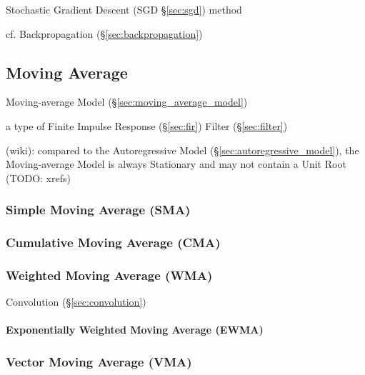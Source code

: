 Stochastic Gradient Descent (SGD \S\ref{sec:sgd}) method

cf. Backpropagation (\S\ref{sec:backpropagation})



\subsection{Moving Average}\label{sec:moving_average}

Moving-average Model (\S\ref{sec:moving_average_model})

a type of Finite Impulse Response (\S\ref{sec:fir}) Filter (\S\ref{sec:filter})

(wiki): compared to the Autoregressive Model (\S\ref{sec:autoregressive_model}),
the Moving-average Model is always Stationary and may not contain a Unit Root
(TODO: xrefs)



\subsubsection{Simple Moving Average (SMA)}\label{sec:sma}

\subsubsection{Cumulative Moving Average (CMA)}\label{sec:cma}

\subsubsection{Weighted Moving Average (WMA)}\label{sec:wma}

Convolution (\S\ref{sec:convolution})



\paragraph{Exponentially Weighted Moving Average (EWMA)}\label{sec:ewma}\hfill



\subsubsection{Vector Moving Average (VMA)}\label{sec:vma}

